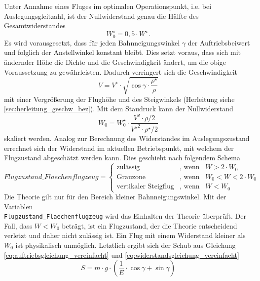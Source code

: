 Unter Annahme eines Fluges im optimalen Operationspunkt, i.e. bei Auslegungsgleitzahl, ist der Nullwiderstand genau die Hälfte des Gesamtwiderstandes \cite[S.82-S.83]{Bruning.1986}
\begin{equation}
	W_0^\star = 0,5\cdot W^\star .
\end{equation}
Es wird vorausgesetzt, dass für jeden Bahnneigungswinkel \ensuremath{\gamma} der Auftriebsbeiwert und folglich der Anstellwinkel konstant bleibt. Dies setzt voraus, dass sich mit ändernder Höhe die Dichte und die Geschwindigkeit ändert, um die obige Voraussetzung zu gewährleisten. Dadurch verringert sich die Geschwindigkeit
\begin{equation}
	V = V^\star\cdot\sqrt{\cos\gamma\cdot\frac{\rho^\star}{\rho}}  \label{eq:geschw_flaechenflugzeug}
\end{equation}
mit einer Vergrößerung der Flughöhe und des Steigwinkels (Herleitung siehe \ref{sec:herleitung_geschw_bez}). Mit dem Staudruck kann der Nullwiderstand 
\begin{equation}
	W_0 = W_0^\star\cdot\frac{V^2\cdot\rho/2}{{V^\star}^2\cdot\rho^\star/2}
\end{equation}
skaliert werden.
Analog zur Berechnung des Widerstandes im Auslegungszustand errechnet sich der Widerstand im aktuellen Betriebspunkt, mit welchem der Flugzustand abgeschätzt werden kann. Dies geschieht nach folgendem Schema
\begin{equation}
Flugzustand\_Flaechenflugzeug = \begin{cases} 
\text{zulässig} & \text{, wenn} \;\;\; W > 2\cdot W_0 \\ 
\text{Grauzone} & \text{, wenn} \;\;\; W_0 < W < 2\cdot W_0 \\ 
\text{vertikaler Steigflug}  & \text{, wenn} \;\;\; W < W_0 
\end{cases}
\end{equation} 
Die Theorie gilt nur für den Bereich kleiner Bahnneigungswinkel. Mit der Variablen \\ \texttt{Flugzustand\_Flaechenflugzeug} wird das Einhalten der Theorie überprüft. Der Fall, dass \ensuremath{W < W_0} beträgt, ist ein Flugzustand, der die Theorie entscheidend verletzt und daher nicht zulässig ist. Ein Flug mit einem Widerstand kleiner als \ensuremath{W_0} ist physikalisch unmöglich.
Letztlich ergibt sich der Schub aus Gleichung \ref{eq:auftriebsgleichung_vereinfacht} und \ref{eq:widerstandsgleichung_vereinfacht}
\begin{equation}
	S = m\cdot g\cdot (\frac{1}{E}\cdot\cos\gamma + \sin\gamma) \label{eq:schub_flaechenflugzeug}
\end{equation}
